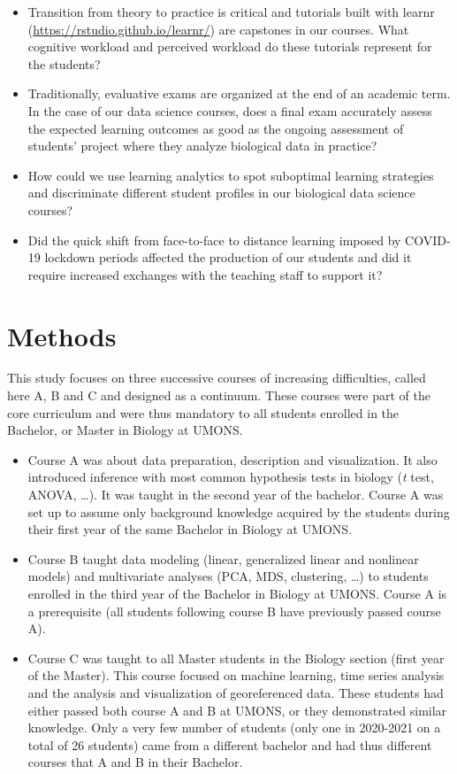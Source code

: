 \documentclass{aims}
\theoremstyle{definition}
\begin{document}
\begin{itemize}
\item
  Transition from theory to practice is critical and tutorials built
  with learnr (\url{https://rstudio.github.io/learnr/}) are capstones in
  our courses. What cognitive workload and perceived workload do these
  tutorials represent for the students?
\item
  Traditionally, evaluative exams are organized at the end of an
  academic term. In the case of our data science courses, does a final
  exam accurately assess the expected learning outcomes as good as the
  ongoing assessment of students' project where they analyze biological
  data in practice?
\item
  How could we use learning analytics to spot suboptimal learning
  strategies and discriminate different student profiles in our
  biological data science courses?
\item
  Did the quick shift from face-to-face to distance learning imposed by
  COVID-19 lockdown periods affected the production of our students and
  did it require increased exchanges with the teaching staff to support
  it?
\end{itemize}

\hypertarget{methods}{%
\section{Methods}\label{methods}}

This study focuses on three successive courses of increasing
difficulties, called here A, B and C and designed as a continuum. These
courses were part of the core curriculum and were thus mandatory to all
students enrolled in the Bachelor, or Master in Biology at UMONS.

\begin{itemize}
\item
  Course A was about data preparation, description and visualization. It
  also introduced inference with most common hypothesis tests in biology
  (\emph{t} test, ANOVA, \ldots). It was taught in the second year of
  the bachelor. Course A was set up to assume only background knowledge
  acquired by the students during their first year of the same Bachelor
  in Biology at UMONS.
\item
  Course B taught data modeling (linear, generalized linear and
  nonlinear models) and multivariate analyses (PCA, MDS, clustering,
  \ldots) to students enrolled in the third year of the Bachelor in
  Biology at UMONS. Course A is a prerequisite (all students following
  course B have previously passed course A).
\item
  Course C was taught to all Master students in the Biology section
  (first year of the Master). This course focused on machine learning,
  time series analysis and the analysis and visualization of
  georeferenced data. These students had either passed both course A and
  B at UMONS, or they demonstrated similar knowledge. Only a very few
  number of students (only one in 2020-2021 on a total of 26 students)
  came from a different bachelor and had thus different courses that A
  and B in their Bachelor.
\end{itemize}
\end{document}
